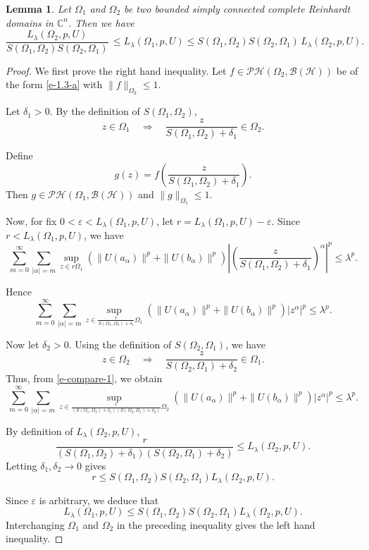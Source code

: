 \documentclass[a4paper,11pt, reqno]{amsart}
\newtheorem{lem}{Lemma}[section]
\theoremstyle{definition}
\begin{document}
	 \begin{lem} \label{lem-3.5}
		Let $\Omega_{1}$ and $\Omega_{2}$ be two bounded simply connected complete Reinhardt domains in $\mathbb{C}^n$. Then we have $$\frac{L_{\lambda}(\Omega_{2}, p,U)}{S(\Omega_{1},\Omega_{2})S(\Omega_{2},\Omega_{1})} \, \leq L_{\lambda}(\Omega_{1}, p,U) \leq S(\Omega_{1},\Omega_{2})S(\Omega_{2},\Omega_{1}) \, L_{\lambda}(\Omega_{2}, p,U).
		$$
	\end{lem}
\begin{proof}
We first prove the right hand inequality.
Let $f \in \mathcal{PH}(\Omega_2,\mathcal{B}(\mathcal{H}))$ be of the form \eqref{e-1.3-a} with $\|f\|_{\Omega_2} \le 1$.

Let $\delta_1>0$.  
By the definition of $S(\Omega_1,\Omega_2)$,
\[
z \in \Omega_1
\quad \Rightarrow \quad
\frac{z}{S(\Omega_1,\Omega_2)+\delta_1} \in \Omega_2.
\]

Define
\[
g(z)=f\!\left(
\frac{z}{S(\Omega_1,\Omega_2)+\delta_1}
\right).
\]
Then $g \in \mathcal{PH}(\Omega_1,\mathcal{B}(\mathcal{H}))$
and $\|g\|_{\Omega_1}\le 1$.
\par
Now, for fix $0<\varepsilon<L_{\lambda}(\Omega_1,p,U)$, let $r = L_{\lambda}(\Omega_1,p,U)-\varepsilon$.
Since $r<L_{\lambda}(\Omega_1,p,U)$, we have
\[
\sum_{m=0}^{\infty}\sum_{|\alpha|=m}
\sup_{z\in r\Omega_1}
(\|U(a_\alpha)\|^p+\|U(b_\alpha)\|^p)
\left|
\left(
\frac{z}{S(\Omega_1,\Omega_2)+\delta_1}
\right)^\alpha
\right|^p
\le \lambda^p.
\]

Hence
\begin{equation} \label{e-compare-1}
\sum_{m=0}^{\infty}\sum_{|\alpha|=m}
\sup_{z\in \frac{r}{S(\Omega_1,\Omega_2)+\delta_1}\Omega_1}
(\|U(a_\alpha)\|^p+\|U(b_\alpha)\|^p)
|z^\alpha|^p
\le \lambda^p.
\end{equation}

Now let $\delta_2>0$.  
Using the definition of $S(\Omega_2,\Omega_1)$, we have
\[
z \in \Omega_2
\quad \Rightarrow \quad
\frac{z}{S(\Omega_2,\Omega_1)+\delta_2} \in \Omega_1.
\]
Thus, from \eqref{e-compare-1}, we obtain
\[
\sum_{m=0}^{\infty}\sum_{|\alpha|=m}
\sup_{z\in
	\frac{r}{(S(\Omega_1,\Omega_2)+\delta_1)(S(\Omega_2,\Omega_1)+\delta_2)}
	\Omega_2}
(\|U(a_\alpha)\|^p+\|U(b_\alpha)\|^p)
|z^\alpha|^p
\le \lambda^p.
\]

By definition of $L_{\lambda}(\Omega_2,p,U)$,
\[
\frac{r}
{(S(\Omega_1,\Omega_2)+\delta_1)(S(\Omega_2,\Omega_1)+\delta_2)}
\le
L_{\lambda}(\Omega_2,p,U).
\]
Letting $\delta_1,\delta_2 \to 0$ gives
\[
r
\le
S(\Omega_1,\Omega_2)S(\Omega_2,\Omega_1)
L_{\lambda}(\Omega_2,p,U).
\]

Since $\varepsilon$ is arbitrary, we deduce that
\[
L_{\lambda}(\Omega_1,p,U)
\le
S(\Omega_1,\Omega_2)S(\Omega_2,\Omega_1)
L_{\lambda}(\Omega_2,p,U).
\]
Interchanging $\Omega_1$ and $\Omega_2$ in the preceding inequality gives the left hand inequality. 
\end{proof}
\end{document}

